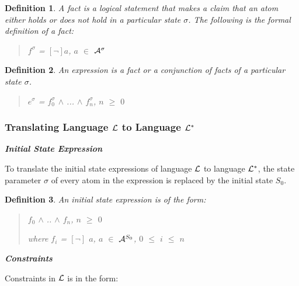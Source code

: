 \documentclass[10pt, twocolumn]{article}
\newtheorem{definition}{Definition}
\begin{document}
        \begin{definition}
          A fact is a logical statement that makes a claim that an atom either
          holds or does not hold in a particular state $\sigma$. The following
          is the formal definition of a fact:

          \begin{quote}
            $f^{\sigma}$ = $[\lnot]$$a$, $a$ $\in$ ${\cal A}^{\sigma}$
          \end{quote}
        \end{definition}

        \begin{definition}
          An expression is a fact or a conjunction of facts of a particular
          state $\sigma$.

          \begin{quote}
            $e^{\sigma}$ = $f^{\sigma}_{0}$ $\land$ ... $\land$ $f^{\sigma}_{n}$, $n$ $\geq$ $0$
          \end{quote}
        \end{definition}

      \subsubsection{Translating Language ${\cal L}$ to Language ${\cal L^{*}}$}

        \noindent \textbf{\emph{Initial State Expression}}

          To translate the initial state expressions of language ${\cal L}$ to
          language ${\cal L}^{*}$, the state parameter $\sigma$ of every atom
          in the expression is replaced by the initial state $S_{0}$.

          \begin{definition}
            An initial state expression is of the form:

            \begin{quote}
              $f_{0}$ $\land$ .. $\land$ $f_{n}$, $n$ $\geq$ $0$

              where $f_{i}$ = $[\lnot]$ $a$, $a$ $\in$ ${\cal A}^{S_{0}}$, $0$ $\leq$ $i$ $\leq$ $n$
            \end{quote}

          \end{definition}

        \noindent \textbf{\emph{Constraints}}

          Constraints in ${\cal L}$ is in the form:
\end{document}
